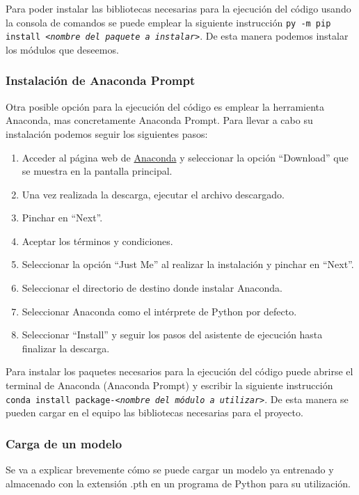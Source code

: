 \begin{itemize}
Para poder instalar las bibliotecas necesarias para la ejecución del código usando la consola de comandos se puede emplear la siguiente instrucción \texttt{py -m pip install \textit{<nombre del paquete a instalar>}}. De esta manera podemos instalar los módulos que deseemos.

\subsubsection{Instalación de Anaconda Prompt}

Otra posible opción para la ejecución del código es emplear la herramienta Anaconda, mas concretamente Anaconda Prompt. Para llevar a cabo su instalación podemos seguir los siguientes pasos:

\begin{enumerate}
    \item Acceder al página web de \href{https://www.anaconda.com/}{Anaconda} y seleccionar la opción ``Download'' que se muestra en la pantalla principal.
    \item Una vez realizada la descarga, ejecutar el archivo descargado.
    \item Pinchar en ``Next''.
    \item Aceptar los términos y condiciones.
    \item Seleccionar la opción ``Just Me'' al realizar la instalación y pinchar en ``Next''.
    \item Seleccionar el directorio de destino donde instalar Anaconda.
    \item Seleccionar Anaconda como el intérprete de Python por defecto.
    \item Seleccionar ``Install'' y seguir los pasos del asistente de ejecución hasta finalizar la descarga.
\end{enumerate}

Para instalar los paquetes necesarios para la ejecución del código puede abrirse el terminal de Anaconda (Anaconda Prompt) y escribir la siguiente instrucción \texttt{conda install package-\textit{<nombre del módulo a utilizar>}}. De esta manera se pueden cargar en el equipo las bibliotecas necesarias para el proyecto.

\subsubsection{Carga de un modelo}

Se va a explicar brevemente cómo se puede cargar un modelo ya entrenado y almacenado con la extensión .pth en un programa de Python para su utilización.


\end{itemize}
